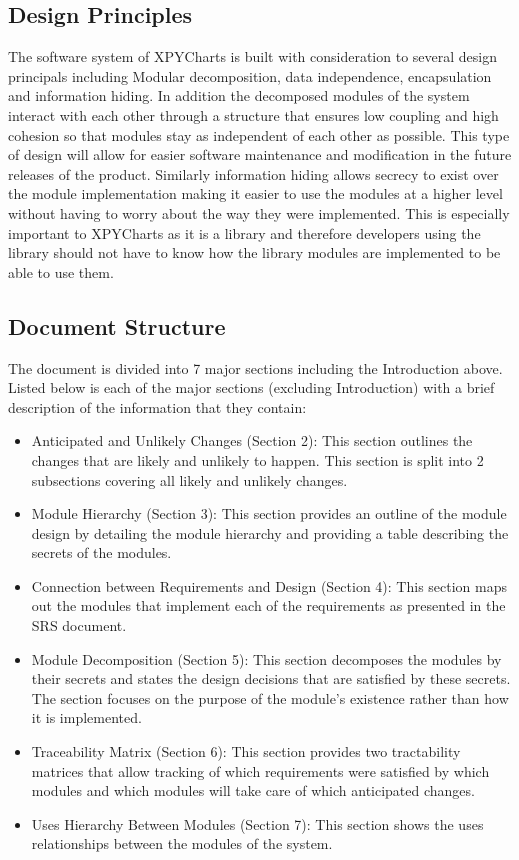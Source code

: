 \documentclass[12pt, titlepage]{article}
\begin{document}
\subsection{Design Principles}
The software system of XPYCharts is built with consideration to several design principals including Modular decomposition, data independence, encapsulation and information hiding. In addition the decomposed modules of the system interact with each other through a structure that ensures low coupling and high cohesion so that modules stay as independent of each other as possible. This type of design will allow for easier software maintenance and modification in the future releases of the product. Similarly information hiding allows secrecy to exist over the module implementation making it easier to use the modules at a higher level without having to worry about the way they were implemented. This is especially important to XPYCharts as it is a library and therefore developers using the library should not have to know how the library modules are implemented to be able to use them.
\subsection{Document Structure}
The document is divided into 7 major sections including the Introduction above. Listed below is each of the major sections (excluding Introduction) with a brief description of the information that they contain:
\begin{itemize}
\item Anticipated and Unlikely Changes (Section 2): This section outlines the changes that are likely and unlikely to happen. This section is split into 2 subsections covering all likely and unlikely changes.
\item Module Hierarchy (Section 3): This section provides an outline of the module design by detailing the module hierarchy and providing a table describing the secrets of the modules.
\item Connection between Requirements and Design (Section 4): This section maps out the modules that implement each of the requirements as presented in the SRS document.
\item Module Decomposition (Section 5): This section decomposes the modules by their secrets and states the design decisions that are satisfied by these secrets. The section focuses on the purpose of the module’s existence rather than how it is implemented.
\item Traceability Matrix (Section 6): This section provides two tractability matrices that allow tracking of which requirements were satisfied by which modules and which modules will take care of which anticipated changes.
\item Uses Hierarchy Between Modules (Section 7): This section shows the uses relationships between the modules of the system.
\end{itemize}
\end{document}
